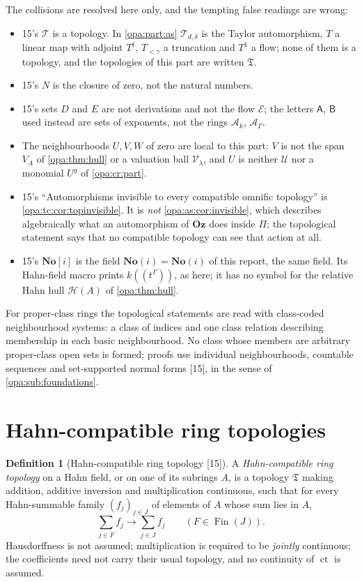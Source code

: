\documentclass[11pt,oneside]{article}
\numberwithin{equation}{section}
\theoremstyle{definition}
\newtheorem{definition}[definition]{Definition}
\theoremstyle{remark}
\newcommand{\No}{\mathbf{No}}
\newcommand{\Oz}{\mathbf{Oz}}
\newcommand{\SC}{\mathbf{No}(i)}
\newcommand{\Ak}{\mathcal A_k}
\newcommand{\UU}{\mathcal U}
\newcommand{\EE}{\mathcal E}
\newcommand{\HH}{\mathcal H}
\newcommand{\ct}{\operatorname{ct}}
\newcommand{\src}[1]{\textup{\textsf{\small[#1]}}}
\begin{document}
The collisions are resolved here only, and the tempting false readings are wrong:
\begin{itemize}[itemsep=1pt]
\item 15's $\mathcal T$ is a topology. In \cref{opa:part:as} $\mathcal T_{d,\delta}$ is the Taylor
automorphism, $T$ a linear map with adjoint $T^\dagger$, $T_{<\gamma}$ a truncation and $T^1$ a flow; none
of them is a topology, and the topologies of this part are written $\mathfrak T$.
\item 15's $N$ is the closure of zero, not the natural numbers.
\item 15's sets $D$ and $E$ are not derivations and not the flow $\EE$; the letters $\mathsf A$, $\mathsf B$
used instead are sets of exponents, not the rings $\Ak$, $\mathcal A_\Gamma$.
\item The neighbourhoods $U,V,W$ of zero are local to this part: $V$ is not the span $V_A$ of
\cref{opa:thm:hull} or a valuation ball $\mathcal V_\lambda$, and $U$ is neither $\UU$ nor a monomial
$U^g$ of \cref{opa:cr:part}.
\item 15's ``Automorphisms invisible to every compatible omnific topology'' is
\cref{opa:tc:cor:topinvisible}. It is \emph{not} \cref{opa:as:cor:invisible}, which describes
algebraically what an automorphism of $\Oz$ does inside $\Pi$; the topological statement says that no
compatible topology can see that action at all.
\item 15's $\No[i]$ is the field $\SC=\No(i)$ of this report, the same field. Its Hahn-field macro
prints $k((t^\Gamma))$, as here; it has no symbol for the relative Hahn hull $\HH(A)$ of
\cref{opa:thm:hull}.
\end{itemize}
For proper-class rings the topological statements are read with class-coded neighbourhood systems:
a class of indices and one class relation describing membership in each basic neighbourhood. No class
whose members are arbitrary proper-class open sets is formed; proofs use individual neighbourhoods,
countable sequences and set-supported normal forms \src{15}, in the sense of
\cref{opa:sub:foundations}.

\section{Hahn-compatible ring topologies}\label{opa:tc:sec:collapse}

\begin{definition}[Hahn-compatible ring topology \src{15}]\label{opa:tc:def:compatible}
A \emph{Hahn-compatible ring topology} on a Hahn field, or on one of its subrings $A$, is a topology
$\mathfrak T$ making addition, additive inversion and multiplication continuous, such that for every
Hahn-summable family $(f_j)_{j\in J}$ of elements of $A$ whose sum lies in $A$,
\[
 \sum_{j\in F}f_j\longrightarrow\sum_{j\in J}f_j\qquad(F\in\operatorname{Fin}(J)).
\]
Hausdorffness is not assumed; multiplication is required to be \emph{jointly} continuous; the
coefficients need not carry their usual topology, and no continuity of $\ct$ is assumed.
\end{definition}
\end{document}
